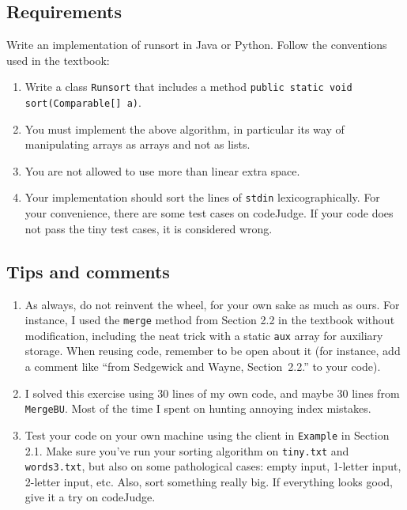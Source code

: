 \documentclass{tufte-handout}
\begin{document}
\subsection{Requirements}
Write an implementation of runsort in Java or Python.
Follow the conventions used in the textbook:
\begin{enumerate}
\item Write a class \texttt{Runsort} that includes a method
\texttt{public static void sort(Comparable[] a)}. 
\item You must implement the above algorithm, in particular its way of manipulating arrays as arrays and not as lists.
\item You are not allowed to use more than linear extra space.
\item Your implementation should sort the lines of \texttt{stdin} lexicographically. For your convenience, there are some test cases on codeJudge. If your code does not pass the tiny test cases, it is considered wrong. 
\end{enumerate}

\subsection{Tips and comments}
\begin{enumerate}
\item As always, do not reinvent the wheel, for your own sake as much as ours.
For instance, I used the \texttt{merge} method from Section 2.2 in the textbook without modification, including the neat trick with a static \texttt{aux} array for auxiliary storage.
When reusing code, remember to be open about it (for instance, add a comment like ``from Sedgewick and Wayne, Section~2.2.'' to your code).
\item I solved this exercise using 30 lines of my own code, and maybe 30 lines from \texttt{MergeBU}.
Most of the time I spent on hunting annoying index mistakes.
\item Test your code on your own machine using the client in \texttt{Example} in Section 2.1.
Make sure you've run your sorting algorithm on \texttt{tiny.txt} and \texttt{words3.txt}, but also on some pathological cases: empty input, 1-letter input, 2-letter input, etc.
Also, sort something really big.
If everything looks good, give it a try on codeJudge.
\end{enumerate}
\end{document}
